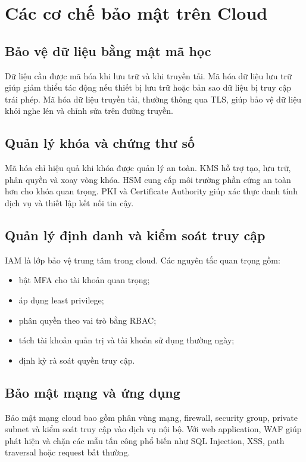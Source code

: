 \chapter{Các cơ chế bảo mật trên Cloud}

\section{Bảo vệ dữ liệu bằng mật mã học}
Dữ liệu cần được mã hóa khi lưu trữ và khi truyền tải. Mã hóa dữ liệu lưu trữ giúp giảm thiểu tác động nếu thiết bị lưu trữ hoặc bản sao dữ liệu bị truy cập trái phép. Mã hóa dữ liệu truyền tải, thường thông qua TLS, giúp bảo vệ dữ liệu khỏi nghe lén và chỉnh sửa trên đường truyền.

\section{Quản lý khóa và chứng thư số}
Mã hóa chỉ hiệu quả khi khóa được quản lý an toàn. KMS hỗ trợ tạo, lưu trữ, phân quyền và xoay vòng khóa. HSM cung cấp môi trường phần cứng an toàn hơn cho khóa quan trọng. PKI và Certificate Authority giúp xác thực danh tính dịch vụ và thiết lập kết nối tin cậy.

\section{Quản lý định danh và kiểm soát truy cập}
IAM là lớp bảo vệ trung tâm trong cloud. Các nguyên tắc quan trọng gồm:
\begin{itemize}
    \item bật MFA cho tài khoản quan trọng;
    \item áp dụng least privilege;
    \item phân quyền theo vai trò bằng RBAC;
    \item tách tài khoản quản trị và tài khoản sử dụng thường ngày;
    \item định kỳ rà soát quyền truy cập.
\end{itemize}

\section{Bảo mật mạng và ứng dụng}
Bảo mật mạng cloud bao gồm phân vùng mạng, firewall, security group, private subnet và kiểm soát truy cập vào dịch vụ nội bộ. Với web application, WAF giúp phát hiện và chặn các mẫu tấn công phổ biến như SQL Injection, XSS, path traversal hoặc request bất thường.

